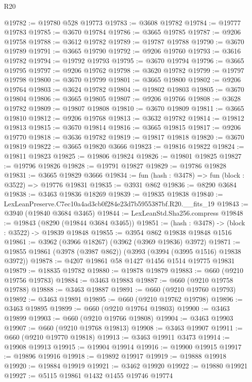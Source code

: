 \begin{lexlean}{R20}
\begin{coremodule}
@19782 := @19780 @528 @19773
@19783 := @3608 @19782
@19784 := @19777 @19783
@19785 := @3670 @19784
@19786 := @3665 @19785
@19787 := @9206 @19758
@19788 := @3612 @19782
@19789 := @19787 @19788
@19790 := @3670 @19789
@19791 := @3665 @19790
@19792 := @9206 @19760
@19793 := @3616 @19782
@19794 := @19792 @19793
@19795 := @3670 @19794
@19796 := @3665 @19795
@19797 := @9206 @19762
@19798 := @3620 @19782
@19799 := @19797 @19798
@19800 := @3670 @19799
@19801 := @3665 @19800
@19802 := @9206 @19764
@19803 := @3624 @19782
@19804 := @19802 @19803
@19805 := @3670 @19804
@19806 := @3665 @19805
@19807 := @9206 @19766
@19808 := @3628 @19782
@19809 := @19807 @19808
@19810 := @3670 @19809
@19811 := @3665 @19810
@19812 := @9206 @19768
@19813 := @3632 @19782
@19814 := @19812 @19813
@19815 := @3670 @19814
@19816 := @3665 @19815
@19817 := @9206 @19770
@19818 := @3636 @19782
@19819 := @19817 @19818
@19820 := @3670 @19819
@19822 := @3665 @19820 @3666
@19823 := @19816 @19822
@19824 := @19811 @19823
@19825 := @19806 @19824
@19826 := @19801 @19825
@19827 := @19796 @19826
@19828 := @19791 @19827
@19829 := @19786 @19828
@19831 := @3665 @19829 @3666
@19834 := fun (hash : @3478) => fun (block : @3522) => @19776 @19831
@19835 := @3931 @862
@19836 := @8290 @3684
@19838 := @3463 @19836 @18269
@19839 := @19835 @19838
@19840 := LexLeanPreserve.C7ec10a4ad3cb0f284e23d7b5955387bf.R20.__fits_19
@19843 := @3940 (@19840 @3684 @3465)
@19844 := LexLeanStd.Sha256.compress
@19848 := @19843 (@8290 (@19844 @3684 @3465))
@19851 := (hash : @3478) -> (block : @3522) -> @19839 @19848
@19855 := @3954 @862 @19838 @19848 @1516
@19861 := @3962 (@3966 @18267) (@3962 (@3969 @19836) @3972)
@19871 := @19855 @19861 (@3978 (@3987 @862)) (@3993 (@3994 (@3995 @1516) @19838 @3972))
@19878 := @4207 @19861 @58 @1427 @1456 @1514 @19775 @19831
@19879 := @18835 @19782
@19880 := @19878 @19879
@19883 := @660 (@9210 @19756 @19783)
@19884 := @3463 @19883
@19887 := @660 (@9210 @19758 @19788)
@19888 := @3463 @19887
@19891 := @660 (@9210 @19760 @19793)
@19892 := @3463 @19891
@19895 := @660 (@9210 @19762 @19798)
@19896 := @3463 @19895
@19899 := @660 (@9210 @19764 @19803)
@19900 := @3463 @19899
@19903 := @660 (@9210 @19766 @19808)
@19904 := @3463 @19903
@19907 := @660 (@9210 @19768 @19813)
@19908 := @3463 @19907
@19911 := @660 (@9210 @19770 @19818)
@19913 := @3463 @19911 @3473
@19914 := @19908 @19913
@19915 := @19904 @19914
@19916 := @19900 @19915
@19917 := @19896 @19916
@19918 := @19892 @19917
@19919 := @19888 @19918
@19920 := @19884 @19919
@19921 := @3462 @19920
@19922 := @19880 @19921
@19927 := @5115 @19861 @1432 @1455 @19746 @19774

\end{coremodule}
\end{lexlean}
